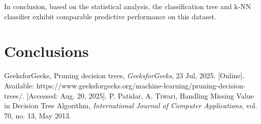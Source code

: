 \documentclass[conference]{IEEEtran}
\begin{document}
In conclusion, based on the statistical analysis, the classification tree and k-NN classifier exhibit comparable predictive performance on this dataset.

\section{\textbf{Conclusions}}

\begin{thebibliography}{00}
 GeeksforGeeks, Pruning decision trees, {\em GeeksforGeeks}, 23 Jul, 2025. [Online]. Available: https://www.geeksforgeeks.org/machine-learning/pruning-decision-trees/. [Accessed: Aug. 20, 2025].
 P. Patidar, A. Tiwari, Handling Missing Value in Decision Tree Algorithm, {\em International Journal of Computer Applications}, vol. 70, no. 13, May 2013.
\end{thebibliography}
\vspace{12pt}
\end{document}
